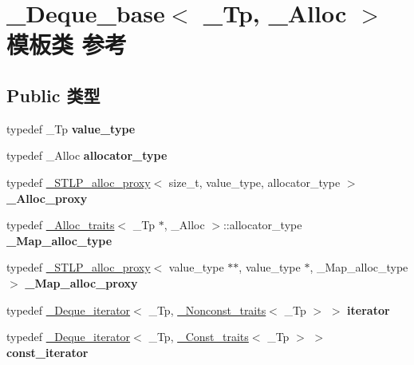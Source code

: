 \hypertarget{class___deque__base}{}\section{\+\_\+\+Deque\+\_\+base$<$ \+\_\+\+Tp, \+\_\+\+Alloc $>$ 模板类 参考}
\label{class___deque__base}
\subsection*{Public 类型}
\begin{DoxyCompactItemize}
\item 
\mbox{\label{class___deque__base_a7b05768648654c4292d300c1e1edd874}} 
typedef \+\_\+\+Tp {\bfseries value\+\_\+type}
\item 
\mbox{\label{class___deque__base_ac3b542e973109f36aaf394ea782af847}} 
typedef \+\_\+\+Alloc {\bfseries allocator\+\_\+type}
\item 
\mbox{\label{class___deque__base_ade11921363ba02f2042f34cbc7953ac0}} 
typedef \hyperlink{class___s_t_l_p__alloc__proxy}{\+\_\+\+S\+T\+L\+P\+\_\+alloc\+\_\+proxy}$<$ size\+\_\+t, value\+\_\+type, allocator\+\_\+type $>$ {\bfseries \+\_\+\+Alloc\+\_\+proxy}
\item 
\mbox{\label{class___deque__base_a10f51e31d8c1404525522831ebccfaa4}} 
typedef \hyperlink{struct___alloc__traits}{\+\_\+\+Alloc\+\_\+traits}$<$ \+\_\+\+Tp $\ast$, \+\_\+\+Alloc $>$\+::allocator\+\_\+type {\bfseries \+\_\+\+Map\+\_\+alloc\+\_\+type}
\item 
\mbox{\label{class___deque__base_ab8a078fecab12a25f4b1e664c05d6a2d}} 
typedef \hyperlink{class___s_t_l_p__alloc__proxy}{\+\_\+\+S\+T\+L\+P\+\_\+alloc\+\_\+proxy}$<$ value\+\_\+type $\ast$$\ast$, value\+\_\+type $\ast$, \+\_\+\+Map\+\_\+alloc\+\_\+type $>$ {\bfseries \+\_\+\+Map\+\_\+alloc\+\_\+proxy}
\item 
\mbox{\label{class___deque__base_acd53f880f8841bce5cbd6d53ac186997}} 
typedef \hyperlink{struct___deque__iterator}{\+\_\+\+Deque\+\_\+iterator}$<$ \+\_\+\+Tp, \hyperlink{struct___nonconst__traits}{\+\_\+\+Nonconst\+\_\+traits}$<$ \+\_\+\+Tp $>$ $>$ {\bfseries iterator}
\item 
\mbox{\label{class___deque__base_a3e994a06b8a14181ca91d90a462e0254}} 
typedef \hyperlink{struct___deque__iterator}{\+\_\+\+Deque\+\_\+iterator}$<$ \+\_\+\+Tp, \hyperlink{struct___const__traits}{\+\_\+\+Const\+\_\+traits}$<$ \+\_\+\+Tp $>$ $>$ {\bfseries const\+\_\+iterator}
\end{DoxyCompactItemize}
